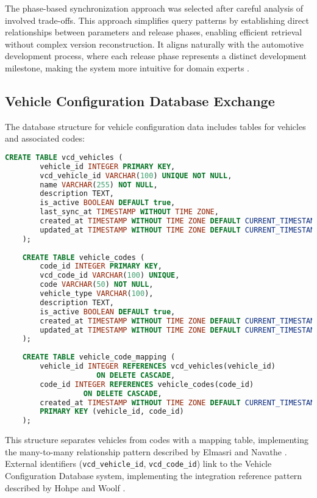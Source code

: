 The phase-based synchronization approach was selected after careful analysis of involved trade-offs. This approach simplifies query patterns by establishing direct relationships between parameters and release phases, enabling efficient retrieval without complex version reconstruction. It aligns naturally with the automotive development process, where each release phase represents a distinct development milestone, making the system more intuitive for domain experts \cite{staron2021automotive}.

\subsection{Vehicle Configuration Database Exchange}
\label{subsec:vcd-data-exchange}

The database structure for vehicle configuration data includes tables for vehicles and associated codes:

\begin{lstlisting}[language=SQL, caption={Vehicle Configuration Storage}, label={lst:vehicle-configuration}]
    CREATE TABLE vcd_vehicles (
        vehicle_id INTEGER PRIMARY KEY,
        vcd_vehicle_id VARCHAR(100) UNIQUE NOT NULL,
        name VARCHAR(255) NOT NULL,
        description TEXT,
        is_active BOOLEAN DEFAULT true,
        last_sync_at TIMESTAMP WITHOUT TIME ZONE,
        created_at TIMESTAMP WITHOUT TIME ZONE DEFAULT CURRENT_TIMESTAMP,
        updated_at TIMESTAMP WITHOUT TIME ZONE DEFAULT CURRENT_TIMESTAMP
    );
    
    CREATE TABLE vehicle_codes (
        code_id INTEGER PRIMARY KEY,
        vcd_code_id VARCHAR(100) UNIQUE,
        code VARCHAR(50) NOT NULL,
        vehicle_type VARCHAR(100),
        description TEXT,
        is_active BOOLEAN DEFAULT true,
        created_at TIMESTAMP WITHOUT TIME ZONE DEFAULT CURRENT_TIMESTAMP,
        updated_at TIMESTAMP WITHOUT TIME ZONE DEFAULT CURRENT_TIMESTAMP
    );
    
    CREATE TABLE vehicle_code_mapping (
        vehicle_id INTEGER REFERENCES vcd_vehicles(vehicle_id) 
                     ON DELETE CASCADE,
        code_id INTEGER REFERENCES vehicle_codes(code_id) 
                  ON DELETE CASCADE,
        created_at TIMESTAMP WITHOUT TIME ZONE DEFAULT CURRENT_TIMESTAMP,
        PRIMARY KEY (vehicle_id, code_id)
    );
    \end{lstlisting}
    
    This structure separates vehicles from codes with a mapping table, implementing the many-to-many relationship pattern described by Elmasri and Navathe \cite{elmasri2015fundamentals}. External identifiers (\texttt{vcd\_vehicle\_id}, \texttt{vcd\_code\_id}) link to the Vehicle Configuration Database system, implementing the integration reference pattern described by Hohpe and Woolf \cite{hohpe2002enterprise}.
    
